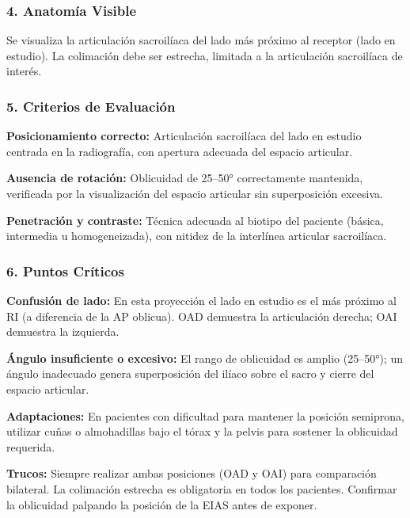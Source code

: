 		\subsubsection*{4. Anatomía Visible}
		
		Se visualiza la articulación sacroilíaca del lado más próximo al receptor (lado en estudio). La colimación debe ser estrecha, limitada a la articulación sacroilíaca de interés.
		
		\subsubsection*{5. Criterios de Evaluación}
		
		\textbf{Posicionamiento correcto:} Articulación sacroilíaca del lado en estudio centrada en la radiografía, con apertura adecuada del espacio articular.
		
		\textbf{Ausencia de rotación:} Oblicuidad de 25--50° correctamente mantenida, verificada por la visualización del espacio articular sin superposición excesiva.
		
		\textbf{Penetración y contraste:} Técnica adecuada al biotipo del paciente (básica, intermedia u homogeneizada), con nitidez de la interlínea articular sacroilíaca.
		
		\subsubsection*{6. Puntos Críticos}
		
		\textbf{Confusión de lado:} En esta proyección el lado en estudio es el más próximo al RI (a diferencia de la AP oblicua). OAD demuestra la articulación derecha; OAI demuestra la izquierda.
		
		\textbf{Ángulo insuficiente o excesivo:} El rango de oblicuidad es amplio (25--50°); un ángulo inadecuado genera superposición del ilíaco sobre el sacro y cierre del espacio articular.
		
		\textbf{Adaptaciones:} En pacientes con dificultad para mantener la posición semiprona, utilizar cuñas o almohadillas bajo el tórax y la pelvis para sostener la oblicuidad requerida.
		
		\textbf{Trucos:} Siempre realizar ambas posiciones (OAD y OAI) para comparación bilateral. La colimación estrecha es obligatoria en todos los pacientes. Confirmar la oblicuidad palpando la posición de la EIAS antes de exponer.
		
		
		
		\onecolumn
		\clearpage
		
